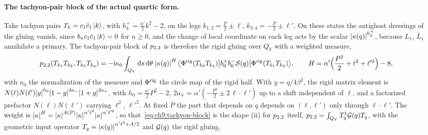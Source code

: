 \paragraph{The tachyon-pair block of the actual quartic form.}
Take tachyon pairs $T_k = c_1 \bar c_1 \ket{k}$, with $h_k^+ = \tfrac{\alpha'}{2} k^2 - 2$, on the legs $k_{1, 2} = \tfrac{P}{2} \pm \ell$, $k_{3, 4} = - \tfrac{P}{2} \pm \ell'$.
On these states the antighost dressings of the gluing vanish, since $b_n c_1 \bar c_1 \ket{k} = 0$ for $n \ge 0$, and the change of local coordinate on each leg acts by the scalar ${|\kappa(q)|}^{h_k^+}$, because $L_1$, $\bar L_1$ annihilate a primary.
The tachyon-pair block of $p_{2,2}$ is therefore the rigid gluing over $Q_V$ with a weighted measure,
\begin{equation}
  \label{eq:ch9:tachyon-block}
  p_{2,2}(T_{k_1} T_{k_2}, T_{k_3} T_{k_4})
    = - \mathrm{i} \kappa_0 \int_{Q_V} \mathrm{d} s \, \mathrm{d} \theta \; {|\kappa(q)|}^{H} \,
      \big\langle \Phi^{\rm rig}(T_{k_3} T_{k_4}) \big| b_0^+ b_0^- {\mathcal{S}}(q) \big| \Phi^{\rm rig}(T_{k_1} T_{k_2}) \big\rangle,
  \qquad
  H
    = \alpha' \Big( \frac{P^2}{2} + \ell^2 + \ell'^2 \Big) - 8,
\end{equation}
with $\kappa_0$ the normalization of the measure and $\Phi^{\rm rig}$ the circle map of the rigid half.
With $y = q / 4 \beta^2$, the rigid matrix element is $N(\ell) N(\ell') {|y|}^{h_0} {|1 - y|}^{2 a_-} {|1 + y|}^{2 a_+}$, with $h_0 = \tfrac{\alpha'}{2} P^2 - 2$, $2 a_\mp = \alpha' (- \tfrac{P^2}{2} \pm 2 \, \ell \cdot \ell')$ up to a shift independent of $\ell$, and a factorized prefactor $N(\ell) N(\ell')$ carrying $\ell^2$, $\ell'^2$.
At fixed $P$ the part that depends on $q$ depends on $(\ell, \ell')$ only through $\ell \cdot \ell'$.
The weight is ${|\kappa|}^H = {|\kappa|}^{A(P)} {|\kappa|}^{\alpha' \ell^2} {|\kappa|}^{\alpha' \ell'^2}$, so that~\eqref{eq:ch9:tachyon-block} is the shape (ii) for $p_{2,2}$ itself, $p_{2,2} = \int_{Q_V} T_q^\dagger {\mathcal{G}}(q) T_q$, with the geometric input operator $T_q = {|\kappa(q)|}^{\alpha' \ell^2 + A / 2}$ and ${\mathcal{G}}(q)$ the rigid gluing.

